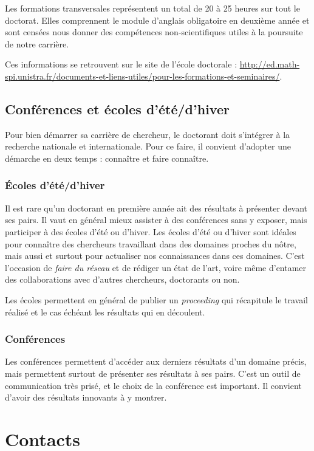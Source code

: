 \documentclass[a5paper]{article}
\begin{document}
\vspace{1em}

Les formations transversales représentent un total de 20 à 25 heures sur tout le doctorat. Elles comprennent le module d'anglais obligatoire en deuxième année et sont censées nous donner des compétences non-scientifiques utiles à la poursuite de notre carrière.

\vspace{2em}

Ces informations se retrouvent sur le site de l'école doctorale : \href{http://ed.math-spi.unistra.fr/documents-et-liens-utiles/pour-les-formations-et-seminaires/}{http://ed.math-spi.unistra.fr/documents-et-liens-utiles/pour-les-formations-et-seminaires/}.

\subsection{Conférences et écoles d'été/d'hiver}
\label{subsec:conf-ecoledete}

Pour bien démarrer sa carrière de chercheur, le doctorant doit s'intégrer à la recherche nationale et internationale. Pour ce faire, il convient d'adopter une démarche en deux temps : connaître et faire connaître.

\subsubsection{\'Ecoles d'été/d'hiver}
\label{subsubsec:ecoledete}

Il est rare qu'un doctorant en première année ait des résultats à présenter devant ses pairs. Il vaut en général mieux assister à des conférences sans y exposer, mais participer à des écoles d'été ou d'hiver. Les écoles d'été ou d'hiver sont idéales pour connaître des chercheurs travaillant dans des domaines proches du nôtre, mais aussi et surtout pour actualiser nos connaissances dans ces domaines. C'est l'occasion de \textit{faire du réseau} et de rédiger un état de l'art, voire même d'entamer des collaborations avec d'autres chercheurs, doctorants ou non.

Les écoles permettent en général de publier un \textit{proceeding} qui récapitule le travail réalisé et le cas échéant les résultats qui en découlent.

\subsubsection{Conférences}
\label{subsubsec:conf}

Les conférences permettent d'accéder aux derniers résultats d'un domaine précis, mais permettent surtout de présenter ses résultats à ses pairs. C'est un outil de communication très prisé, et le choix de la conférence est important. Il convient d'avoir des résultats innovants à y montrer.

\appendix

\section{Contacts}
\label{sec:contacts}
\end{document}
